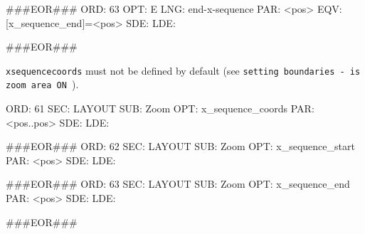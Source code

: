 \documentclass[11pt]{article}
\def\nwendcode{\endtrivlist \endgroup} %
\let\nwdocspar=\par                    %
\begin{document}
###EOR###
ORD: 63
OPT: E
LNG: end-x-sequence
PAR: <pos>
EQV: [x_sequence_end]=<pos>
SDE: 
LDE: 

###EOR###
\nwendcode{}\nwdocspar

{\tt{}x{}sequence{}coords} must not be defined by default (see {\tt{}\LA{}setting boundaries - is zoom area ON~{\nwtagstyle{}}\RA{}}). %

\nwenddocs{}\plusendmoddef
ORD: 61
SEC: LAYOUT
SUB: Zoom
OPT: x_sequence_coords
PAR: <pos..pos>
SDE: 
LDE: 

###EOR###
ORD: 62
SEC: LAYOUT
SUB: Zoom
OPT: x_sequence_start
PAR: <pos>
SDE: 
LDE: 

###EOR###
ORD: 63
SEC: LAYOUT
SUB: Zoom
OPT: x_sequence_end
PAR: <pos>
SDE: 
LDE: 

###EOR###
\nwendcode{}\nwdocspar
 
\end{document}
